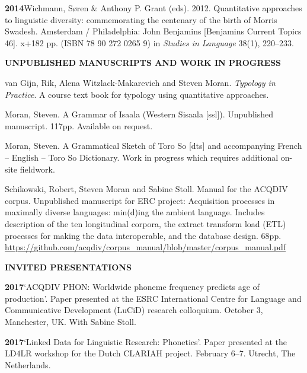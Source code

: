 \documentclass[11pt]{article}
\newcommand{\hangpara}{
 \setlength{\parindent}{0in} %
 \hangindent=0.42in %
}
\begin{document}

\hangpara
{\bf 2014}\hspace{1ex}Wichmann, S{\o}ren \& Anthony P. Grant (eds). 2012. Quantitative approaches to linguistic diversity: commemorating the centenary of the birth of Morris Swadesh. Amsterdam / Philadelphia: John Benjamins [Benjamins Current Topics 46]. x+182 pp. (ISBN 78 90 272 0265 9) in \textit{Studies in Language} 38(1), 220--233.

\vskip 20pt
\begin{flushleft}
{\bf UNPUBLISHED MANUSCRIPTS AND WORK IN PROGRESS}
\end{flushleft}

\hangpara
van Gijn, Rik, Alena Witzlack-Makarevich and Steven Moran. {\it Typology in Practice}. A course text book for typology using quantitative approaches.

\vskip 6pt
\hangpara
Moran, Steven. A Grammar of Isaala (Western Sisaala [ssl]). Unpublished manuscript. 117pp. Available on request.

\vskip 6pt
\hangpara
Moran, Steven. A Grammatical Sketch of Toro So [dts] and accompanying French -- English -- Toro So Dictionary. Work in progress which requires additional  on-site fieldwork.

\vskip 6pt
\hangpara
Schikowski, Robert, Steven Moran and Sabine Stoll. Manual for the ACQDIV corpus. Unpublished manuscript for ERC project: Acquisition processes in maximally diverse languages: min(d)ing the ambient language. Includes description of the ten longitudinal corpora, the extract transform load (ETL) processes for making the data interoperable, and the database design. 68pp. \url{https://github.com/acqdiv/corpus_manual/blob/master/corpus_manual.pdf}


\vskip 20pt
\begin{flushleft}
{\bf INVITED PRESENTATIONS}
\end{flushleft}

\hangpara
{\bf 2017}\hspace{1ex}`ACQDIV PHON: Worldwide phoneme frequency predicts age of production'. Paper presented at the ESRC International Centre for Language and Communicative Development (LuCiD) research colloquium. October 3, Manchester, UK. With Sabine Stoll.

\vskip 6pt
\hangpara
{\bf 2017}\hspace{1ex}`Linked Data for Linguistic Research: Phonetics'. Paper presented at the LD4LR workshop for the Dutch CLARIAH project. February 6--7. Utrecht, The Netherlands.
\end{document}
